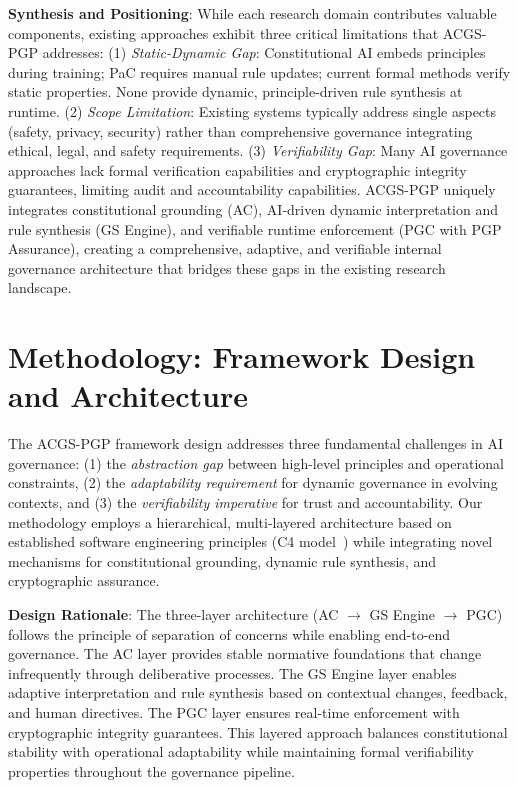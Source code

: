 \documentclass[sigconf,review,anonymous=false]{acmart} %
\begin{document}
\textbf{Synthesis and Positioning}: While each research domain contributes valuable components, existing approaches exhibit three critical limitations that ACGS-PGP addresses: (1) \textit{Static-Dynamic Gap}: Constitutional AI embeds principles during training; PaC requires manual rule updates; current formal methods verify static properties. None provide dynamic, principle-driven rule synthesis at runtime. (2) \textit{Scope Limitation}: Existing systems typically address single aspects (safety, privacy, security) rather than comprehensive governance integrating ethical, legal, and safety requirements. (3) \textit{Verifiability Gap}: Many AI governance approaches lack formal verification capabilities and cryptographic integrity guarantees, limiting audit and accountability capabilities. ACGS-PGP uniquely integrates constitutional grounding (AC), AI-driven dynamic interpretation and rule synthesis (GS Engine), and verifiable runtime enforcement (PGC with PGP Assurance), creating a comprehensive, adaptive, and verifiable internal governance architecture that bridges these gaps in the existing research landscape.

\section{Methodology: Framework Design and Architecture}
\label{sec:methodology}
The ACGS-PGP framework design addresses three fundamental challenges in AI governance: (1) the \textit{abstraction gap} between high-level principles and operational constraints, (2) the \textit{adaptability requirement} for dynamic governance in evolving contexts, and (3) the \textit{verifiability imperative} for trust and accountability. Our methodology employs a hierarchical, multi-layered architecture based on established software engineering principles (C4 model~\cite{BrownSoftwareArchitectureC4}) while integrating novel mechanisms for constitutional grounding, dynamic rule synthesis, and cryptographic assurance.

\textbf{Design Rationale}: The three-layer architecture (AC $\rightarrow$ GS Engine $\rightarrow$ PGC) follows the principle of separation of concerns while enabling end-to-end governance. The AC layer provides stable normative foundations that change infrequently through deliberative processes. The GS Engine layer enables adaptive interpretation and rule synthesis based on contextual changes, feedback, and human directives. The PGC layer ensures real-time enforcement with cryptographic integrity guarantees. This layered approach balances constitutional stability with operational adaptability while maintaining formal verifiability properties throughout the governance pipeline.
\end{document}
